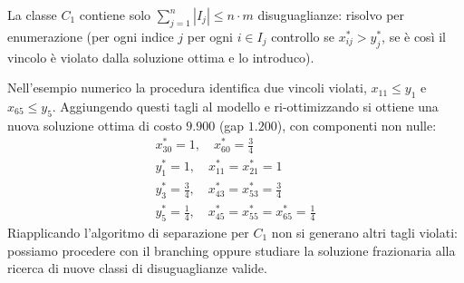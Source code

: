 \begin{itemize}
	La classe $C_1$ contiene solo $\sum_{j=1}^n|I_j|\le n \cdot m$ disuguaglianze: risolvo per enumerazione (per ogni indice $j$ per ogni $i \in I_j$ controllo se $x_{ij}^*>y_j^*$, se è così il vincolo è violato dalla soluzione ottima e lo introduco).

	Nell'esempio numerico la procedura identifica due vincoli violati, $x_{11}\le y_1$ e $x_{65}\le y_5$. Aggiungendo questi tagli al modello e ri-ottimizzando si ottiene una nuova soluzione ottima di costo $9.900$ (gap $1.200$), con componenti non nulle:
	\begin{equation*}
		\begin{aligned}
			x_{30}^*=1,\quad x_{60}^*=\tfrac{3}{4}\\
			y_1^*=1,\quad x_{11}^*=x_{21}^*=1\\
			y_3^*=\tfrac{3}{4},\quad x_{43}^*=x_{53}^*=\tfrac{3}{4}\\
			y_5^*=\tfrac{1}{4},\quad x_{45}^*=x_{55}^*=x_{65}^*=\tfrac{1}{4}
		\end{aligned}
	\end{equation*}
	Riapplicando l'algoritmo di separazione per $C_1$ non si generano altri tagli violati: possiamo procedere con il branching oppure studiare la soluzione frazionaria alla ricerca di nuove classi di disuguaglianze valide.


\end{itemize}
